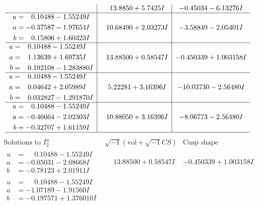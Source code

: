 \documentclass[1p]{elsarticle_modified}
\theoremstyle{definition}
\newcommand{\I}{\sqrt{-1}}
\begin{document}
$$\begin{array}{c|c|c}
 & \phantom{-}13.8850 + 5.7425 I & -0.45034 - 6.13276 I \\ \hline\begin{aligned}
u &= \phantom{-}0.10488 - 1.55249 I \\
a &= -0.37587 - 1.97654 I \\
b &= \phantom{-}0.15806 + 1.60323 I\end{aligned}
 & \phantom{-}10.68490 + 2.03273 I & -3.58849 - 2.05401 I \\ \hline\begin{aligned}
u &= \phantom{-}0.10488 - 1.55249 I \\
a &= \phantom{-}1.13639 + 1.69735 I \\
b &= \phantom{-}0.192108 - 1.283880 I\end{aligned}
 & \phantom{-}13.88500 + 0.58547 I & -0.450339 + 1.003158 I \\ \hline\begin{aligned}
u &= \phantom{-}0.10488 - 1.55249 I \\
a &= \phantom{-}0.04642 + 2.05989 I \\
b &= \phantom{-}0.032827 - 1.291870 I\end{aligned}
 & \phantom{-}5.22281 + 3.16396 I & -10.03730 - 2.56480 I \\ \hline\begin{aligned}
u &= \phantom{-}0.10488 - 1.55249 I \\
a &= -0.46664 - 2.02303 I \\
b &= -0.32707 + 1.61159 I\end{aligned}
 & \phantom{-}10.88050 + 3.16396 I & -8.06773 - 2.56480 I\\
 \hline 
 \end{array}$$\newpage$$\begin{array}{c|c|c}  
\text{Solutions to }I^u_{2}& \I (\text{vol} + \sqrt{-1}CS) & \text{Cusp shape}\\
 \hline 
\begin{aligned}
u &= \phantom{-}0.10488 - 1.55249 I \\
a &= -0.05031 - 2.08668 I \\
b &= -0.78123 + 2.01911 I\end{aligned}
 & \phantom{-}13.88500 + 0.58547 I & -0.450339 + 1.003158 I \\ \hline\begin{aligned}
u &= \phantom{-}0.10488 - 1.55249 I \\
a &= -1.07189 - 1.91560 I \\
b &= -0.197571 + 1.376010 I\end{aligned}

\end{array}$$
\end{document}
